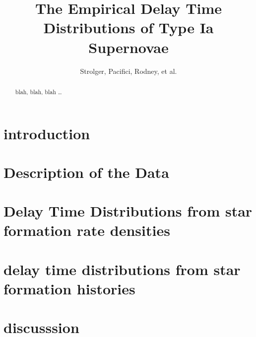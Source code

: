 \documentclass[apj]{aastex}
\begin{document}
\title{The Empirical Delay Time Distributions of Type Ia Supernovae}
\author{Strolger, Pacifici, Rodney, et al.}

\begin{abstract}
blah, blah, blah \ldots
\end{abstract}

\section{introduction}

\section{Description of the Data}

\section{Delay Time Distributions from star formation rate densities}

\section{delay time distributions from star formation histories}

\section{discusssion}
\end{document}

